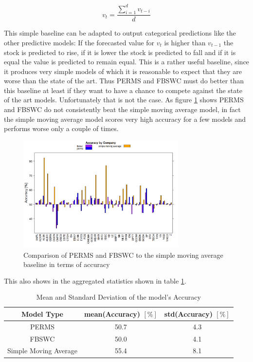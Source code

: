 \[v_t = \frac{\sum_{i=1}^d v_{t-i}}{d}\] 

This simple baseline can be adapted to output categorical predictions like the other predictive models: If the forecasted value for $v_t$ is higher than $v_{t-1}$ the stock is predicted to rise, if it is lower the stock is predicted to fall and if it is equal the value is predicted to remain equal. This is a rather useful baseline, since it produces very simple models of which it is reasonable to expect that they are worse than the state of the art. Thus PERMS and FBSWC must do better than this baseline at least if they want to have a chance to compete against the state of the art models. Unfortunately that is not the case. As figure \ref{fig_baselineComparisonBarchart} shows PERMS and FBSWC do not consistently beat the simple moving average model, in fact the simple moving average model scores very high accuracy for a few models and performs worse only a couple of times.

\begin{figure}[h]
	\centering
  	\includegraphics[width=0.75\textwidth]{baselineComparisonBarchart}
	\caption{Comparison of PERMS and FBSWC to the simple moving average baseline in terms of accuracy}
	\label{fig_baselineComparisonBarchart}
\end{figure}

This also shows in the aggregated statistics shown in table \ref{table_baselineAccuracy}. 

\begin{table}	
\caption{Mean and Standard Deviation of the model's Accuracy\label{table_baselineAccuracy}}
\begin{tabular}{ c | c | c}		
  Model Type & mean(Accuracy) $[\%]$ & std(Accuracy) $[\%]$\\
  \hline
  PERMS & 50.7 & 4.3\\
  FBSWC & 50.0 & 4.1\\
  Simple Moving Average & 55.4 & 8.1\\
\end{tabular}
\end{table}

